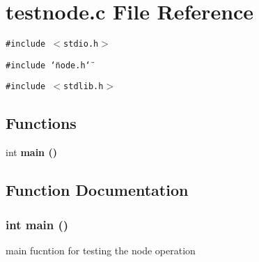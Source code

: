 \section{testnode.c File Reference}
\label{testnode_8c}
{\tt \#include $<$stdio.h$>$}\par
{\tt \#include \char`\"{}node.h\char`\"{}}\par
{\tt \#include $<$stdlib.h$>$}\par
\subsection*{Functions}
\begin{CompactItemize}
\item 
int \bf{main} ()
\end{CompactItemize}


\subsection{Function Documentation}
\subsubsection{\setlength{\rightskip}{0pt plus 5cm}int main ()}\label{testnode_8c_e66f6b31b5ad750f1fe042a706a4e3d4}


main fucntion for testing the node operation 
